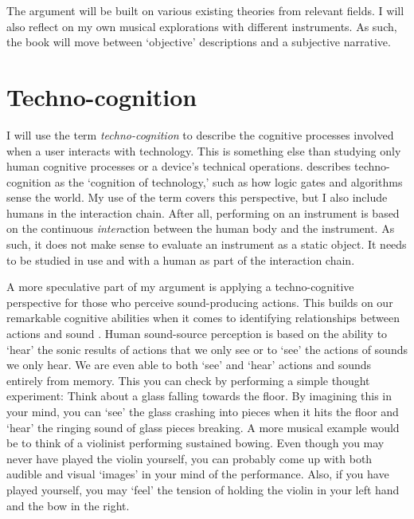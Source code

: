 The argument will be built on various existing theories from relevant fields. I will also reflect on my own musical explorations with different instruments. As such, the book will move between `objective' descriptions and a subjective narrative.


\section{Techno-cognition}

I will use the term \emph{techno-cognition} to describe the cognitive processes involved when a user interacts with technology. This is something else than studying only human cognitive processes or a device's technical operations. \citet{kockelman_agent_2013} describes techno-cognition as the `cognition of technology,' such as how logic gates and algorithms sense the world. My use of the term covers this perspective, but I also include humans in the interaction chain. After all, performing on an instrument is based on the continuous \emph{inter}action between the human body and the instrument. As such, it does not make sense to evaluate an instrument as a static object. It needs to be studied in use and with a human as part of the interaction chain.

A more speculative part of my argument is applying a techno-cognitive perspective for those who perceive sound-producing actions. This builds on our remarkable cognitive abilities when it comes to identifying relationships between actions and sound \citep{yost_auditory_2008}. Human sound-source perception is based on the ability to `hear' the sonic results of actions that we only see or to `see' the actions of sounds we only hear. We are even able to both `see' and `hear' actions and sounds entirely from memory. This you can check by performing a simple thought experiment: Think about a glass falling towards the floor. By imagining this in your mind, you can `see' the glass crashing into pieces when it hits the floor and `hear' the ringing sound of glass pieces breaking. A more musical example would be to think of a violinist performing sustained bowing. Even though you may never have played the violin yourself, you can probably come up with both audible and visual `images' in your mind of the performance. Also, if you have played yourself, you may `feel' the tension of holding the violin in your left hand and the bow in the right.

